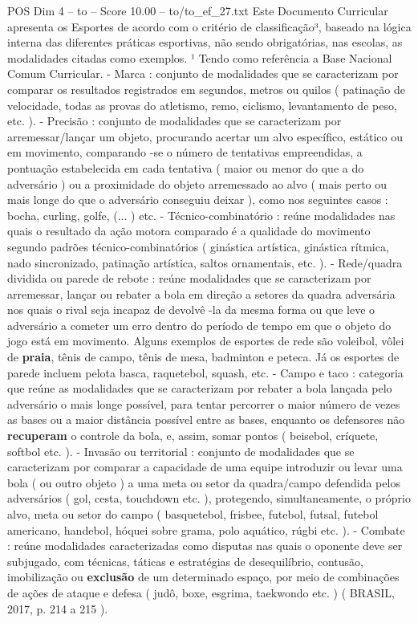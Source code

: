 \begin{textsample}{POS Dim 4 – to – Score 10.00 – to/to\_ef\_27.txt}
Este Documento Curricular apresenta os Esportes de acordo com o critério de classificação³, baseado na lógica interna das diferentes práticas esportivas, não sendo obrigatórias, nas escolas, as modalidades citadas como exemplos. ¹ Tendo como referência a Base Nacional Comum Curricular. - Marca : conjunto de modalidades que se caracterizam por comparar os resultados registrados em segundos, metros ou quilos ( patinação de velocidade, todas as provas do atletismo, remo, ciclismo, levantamento de peso, etc. ). - Precisão : conjunto de modalidades que se caracterizam por arremessar/lançar um objeto, procurando acertar um alvo específico, estático ou em movimento, comparando -se o número de tentativas empreendidas, a pontuação estabelecida em cada tentativa ( maior ou menor do que a do adversário ) ou a proximidade do objeto arremessado ao alvo ( mais perto ou mais longe do que o adversário conseguiu deixar ), como nos seguintes casos : bocha, curling, golfe, (... ) etc. - Técnico-combinatório : reúne modalidades nas quais o resultado da ação motora comparado é a qualidade do movimento segundo padrões técnico-combinatórios ( ginástica artística, ginástica rítmica, nado sincronizado, patinação artística, saltos ornamentais, etc. ). - Rede/quadra dividida ou parede de rebote : reúne modalidades que se caracterizam por arremessar, lançar ou rebater a bola em direção a setores da quadra adversária nos quais o rival seja incapaz de devolvê -la da mesma forma ou que leve o adversário a cometer um erro dentro do período de tempo em que o objeto do jogo está em movimento.
Alguns exemplos de esportes de rede são voleibol, vôlei de \textbf{praia}, tênis de campo, tênis de mesa, badminton e peteca.
Já os esportes de parede incluem pelota basca, raquetebol, squash, etc. - Campo e taco : categoria que reúne as modalidades que se caracterizam por rebater a bola lançada pelo adversário o mais longe possível, para tentar percorrer o maior número de vezes as bases ou a maior distância possível entre as bases, enquanto os defensores não \textbf{recuperam} o controle da bola, e, assim, somar pontos ( beisebol, críquete, softbol etc. ). - Invasão ou territorial : conjunto de modalidades que se caracterizam por comparar a capacidade de uma equipe introduzir ou levar uma bola ( ou outro objeto ) a uma meta ou setor da quadra/campo defendida pelos adversários ( gol, cesta, touchdown etc. ), protegendo, simultaneamente, o próprio alvo, meta ou setor do campo ( basquetebol, frisbee, futebol, futsal, futebol americano, handebol, hóquei sobre grama, polo aquático, rúgbi etc. ). - Combate : reúne modalidades caracterizadas como disputas nas quais o oponente deve ser subjugado, com técnicas, táticas e estratégias de desequilíbrio, contusão, imobilização ou \textbf{exclusão} de um determinado espaço, por meio de combinações de ações de ataque e defesa ( judô, boxe, esgrima, taekwondo etc. ) ( BRASIL, 2017, p. 214 a 215 ).

\end{textsample}
